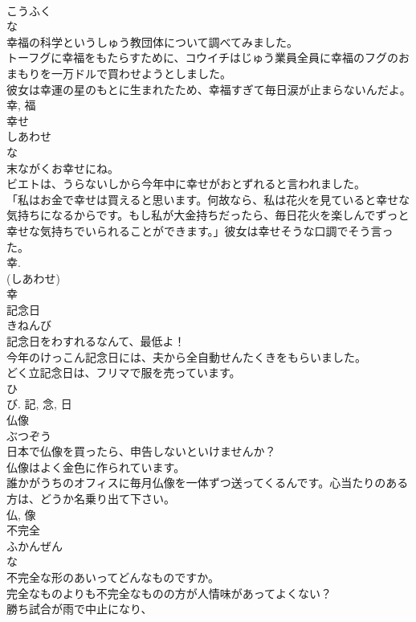 \documentclass[8pt]{extreport}
\begin{document}
\begin{CJK}{UTF8}{min}
\\	こうふく	
\\	な 
\\	幸福の科学というしゅう教団体について調べてみました。	
\\	トーフグに幸福をもたらすために、コウイチはじゅう業員全員に幸福のフグのおまもりを一万ドルで買わせようとしました。	
\\	彼女は幸運の星のもとに生まれたため、幸福すぎて毎日涙が止まらないんだよ。	
\\	幸, 福	
\\	幸せ	
\\	しあわせ	
\\	な 
\\	末ながくお幸せにね。	
\\	ビエトは、うらないしから今年中に幸せがおとずれると言われました。	
\\	「私はお金で幸せは買えると思います。何故なら、私は花火を見ていると幸せな気持ちになるからです。もし私が大金持ちだったら、毎日花火を楽しんでずっと幸せな気持ちでいられることができます。」彼女は幸せそうな口調でそう言った。	
\\	幸. 
\\	(しあわせ) 
\\	幸	
\\	記念日	
\\	きねんび	
\\	記念日をわすれるなんて、最低よ！	
\\	今年のけっこん記念日には、夫から全自動せんたくきをもらいました。	
\\	どく立記念日は、フリマで服を売っています。	
\\	ひ 
\\	び.	記, 念, 日	
\\	仏像	
\\	ぶつぞう	
\\	日本で仏像を買ったら、申告しないといけませんか？	
\\	仏像はよく金色に作られています。	
\\	誰かがうちのオフィスに毎月仏像を一体ずつ送ってくるんです。心当たりのある方は、どうか名乗り出て下さい。	
\\	仏, 像	
\\	不完全	
\\	ふかんぜん	
\\	な 
\\	不完全な形のあいってどんなものですか。	
\\	完全なものよりも不完全なものの方が人情味があってよくない？	
\\	勝ち試合が雨で中止になり、

\end{CJK}
\end{document}
